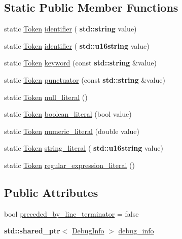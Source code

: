 \subsection*{Static Public Member Functions}
\begin{DoxyCompactItemize}
\item 
static \hyperlink{class_token}{Token} \hyperlink{class_token_a15dc839f68c100e6041c7ca089ea9005}{identifier} (\textbf{ std\+::string} value)
\item 
static \hyperlink{class_token}{Token} \hyperlink{class_token_a6233a8babfc11fbf5ad709d812c23bfd}{identifier} (\textbf{ std\+::u16string} value)
\item 
static \hyperlink{class_token}{Token} \hyperlink{class_token_a8c0612a3b0a9b6eb05dfd9e75aafcb33}{keyword} (const \textbf{ std\+::string} \&value)
\item 
static \hyperlink{class_token}{Token} \hyperlink{class_token_aef1c084308395ed9ad7328a6aa321e5a}{punctuator} (const \textbf{ std\+::string} \&value)
\item 
static \hyperlink{class_token}{Token} \hyperlink{class_token_a14d7666a206aae66e9d78b0c99db9c35}{null\+\_\+literal} ()
\item 
static \hyperlink{class_token}{Token} \hyperlink{class_token_a95cc3830383b9cfb05ae2b29ca776c41}{boolean\+\_\+literal} (bool value)
\item 
static \hyperlink{class_token}{Token} \hyperlink{class_token_ab457a4f53eef0512a5fd2ea0206e3c1e}{numeric\+\_\+literal} (double value)
\item 
static \hyperlink{class_token}{Token} \hyperlink{class_token_a51926fd7d348479bf923c6fce7650f35}{string\+\_\+literal} (\textbf{ std\+::u16string} value)
\item 
static \hyperlink{class_token}{Token} \hyperlink{class_token_a70cc5b1f483d5f8f58290e70867d542e}{regular\+\_\+expression\+\_\+literal} ()
\end{DoxyCompactItemize}
\subsection*{Public Attributes}
\begin{DoxyCompactItemize}
\item 
bool \hyperlink{class_token_afac81ad105ee2e0ce26fa5c9adcf8e57}{preceded\+\_\+by\+\_\+line\+\_\+terminator} = false
\item 
\textbf{ std\+::shared\+\_\+ptr}$<$ \hyperlink{struct_token_1_1_debug_info}{Debug\+Info} $>$ \hyperlink{class_token_ae1c97965fb8e3c18c0b4e38b6d826266}{debug\+\_\+info}
\end{DoxyCompactItemize}


